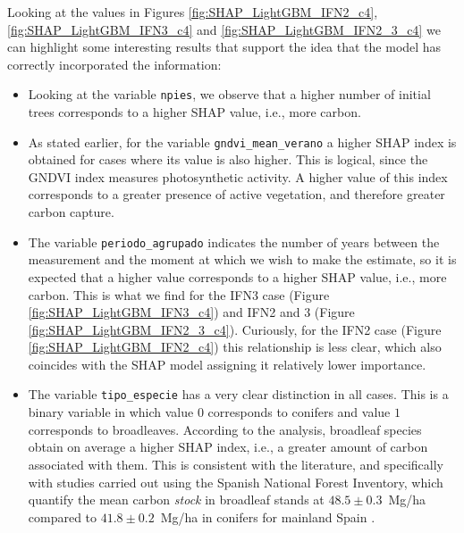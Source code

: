 Looking at the values in Figures \ref{fig:SHAP_LightGBM_IFN2_c4}, \ref{fig:SHAP_LightGBM_IFN3_c4} and \ref{fig:SHAP_LightGBM_IFN2_3_c4} we can highlight some interesting results that support the idea that the model has correctly incorporated the information:
\begin{itemize}
      \item Looking at the variable \texttt{npies}, we observe that a higher number of initial trees corresponds to a higher SHAP value, i.e., more carbon.
      \item As stated earlier, for the variable \texttt{gndvi\_mean\_verano} a higher SHAP index is obtained for cases where its value is also higher. This is logical, since the GNDVI index measures photosynthetic activity. A higher value of this index corresponds to a greater presence of active vegetation, and therefore greater carbon capture.
      \item The variable \texttt{periodo\_agrupado} indicates the number of years between the measurement and the moment at which we wish to make the estimate, so it is expected that a higher value corresponds to a higher SHAP value, i.e., more carbon. This is what we find for the IFN3 case (Figure \ref{fig:SHAP_LightGBM_IFN3_c4}) and IFN2 and 3 (Figure \ref{fig:SHAP_LightGBM_IFN2_3_c4}). Curiously, for the IFN2 case (Figure \ref{fig:SHAP_LightGBM_IFN2_c4}) this relationship is less clear, which also coincides with the SHAP model assigning it relatively lower importance.
      \item The variable \texttt{tipo\_especie} has a very clear distinction in all cases. This is a binary variable in which value $0$ corresponds to conifers and value $1$ corresponds to broadleaves. According to the analysis, broadleaf species obtain on average a higher SHAP index, i.e., a greater amount of carbon associated with them. This is consistent with the literature, and specifically with studies carried out using the Spanish National Forest Inventory, which quantify the mean carbon \textit{stock} in broadleaf stands at $48.5 \pm 0.3$~Mg/ha compared to $41.8 \pm 0.2$~Mg/ha in conifers for mainland Spain \cite{vayreda2012carbon}.


\end{itemize}
